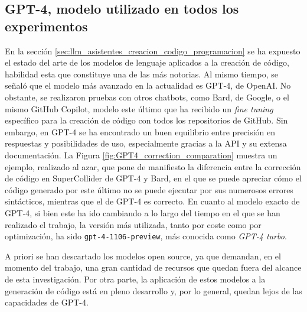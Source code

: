 \subsection{GPT-4, modelo utilizado en todos los experimentos}

En la sección \ref{sec:llm_asistentes_creacion_codigo_programacion} se ha expuesto el estado del arte de los modelos de lenguaje aplicados a la creación de código, habilidad esta que constituye una de las más notorias. Al mismo tiempo, se señaló que el modelo más avanzado en la actualidad es GPT-4, de OpenAI. No obstante, se realizaron pruebas con otros chatbots, como Bard, de Google, o el mismo GitHub Copilot, modelo este último que ha recibido un \emph{fine tuning} específico para la creación de código con todos los repositorios de GitHub. Sin embargo, en GPT-4 se ha encontrado un buen equilibrio entre precisión en respuestas y posibilidades de uso, especialmente gracias a la API y su extensa documentación. La Figura \ref{fig:GPT4_correction_comparation} muestra un ejemplo, realizado al azar, que pone de manifiesto la diferencia entre la corrección de código en SuperCollider de GPT-4 y Bard, en el que se puede apreciar cómo el código generado por este último no se puede ejecutar por sus numerosos errores sintácticos, mientras que el de GPT-4 es correcto. En cuanto al modelo exacto de GPT-4, si bien este ha ido cambiando a lo largo del tiempo en el que se han realizado el trabajo, la versión más utilizada, tanto por coste como por optimización, ha sido \texttt{gpt-4-1106-preview}, más conocida como \emph{GPT-4 turbo}.

A priori se han descartado los modelos open source, ya que demandan, en el momento del trabajo, una gran cantidad de recursos que quedan fuera del alcance de esta investigación. Por otra parte, la aplicación de estos modelos a la generación de código está en pleno desarrollo y, por lo general, quedan lejos de las capacidades de GPT-4.



